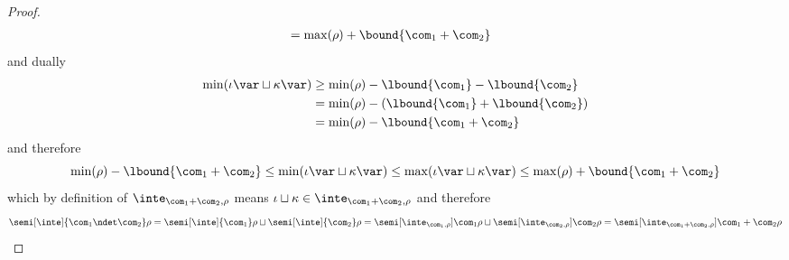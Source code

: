 \begin{proof}
\begin{align*}
                                    & = \max(\rho) + \bound{\com_1 + \com_2}
  \end{align*}
  and dually
  \begin{align*}
    \min(\iota\var\sqcup\kappa\var) & \geq \min(\rho) - \lbound{\com_1} - \lbound{\com_2} \\
                                    & = \min(\rho) - (\lbound{\com_1} + \lbound{\com_2}) \\
                                    & = \min(\rho) - \lbound{\com_1 + \com_2}
  \end{align*}
  and therefore
  \begin{equation*}
    \min(\rho) - \lbound{\com_1 + \com_2} \leq \min(\iota\var \sqcup \kappa\var) \leq \max(\iota\var \sqcup \kappa\var) \leq \max(\rho) + \bound{\com_1 + \com_2}
  \end{equation*}
  which by definition of \(\inte_{\com_1 + \com_2, \rho}\) means
  \(\iota \sqcup \kappa \in \inte_{\com_1 + \com_2, \rho}\) and
  therefore
  \begin{equation*}
    \semi[\inte]{\com_1 \ndet \com_2}\rho = \semi[\inte]{\com_1}\rho \sqcup \semi[\inte]{\com_2}\rho = \semi[\inte_{\com_1, \rho}]{\com_1}\rho \sqcup \semi[\inte_{\com_2, \rho}]{\com_2}\rho = \semi[\inte_{\com_1 + \com_2, \rho}]{\com_1 + \com_2}\rho
  \end{equation*}
  
  
  \medskip


\end{proof}
